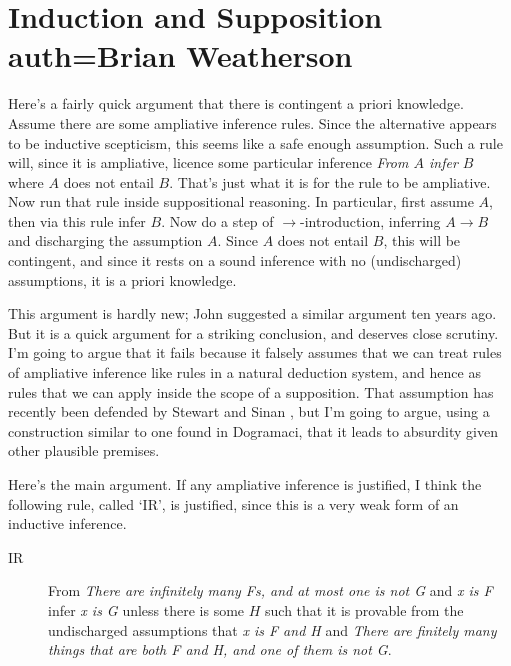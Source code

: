 \providecommand{\ECH}{$E \supset H$}
\providecommand{\mECH}{E \supset H}
\providecommand{\apr}{\textit{a priori}}
\providecommand{\apo}{\textit{a posteriori}}

\chapter[Induction and Supposition]{Induction and Supposition auth=Brian Weatherson}


\noindent Here's a fairly quick argument that there is contingent a priori knowledge. Assume there are some ampliative inference rules. Since the alternative appears to be inductive scepticism, this seems like a safe enough assumption. Such a rule will, since it is ampliative, licence some particular inference \textit{From $A$ infer $B$} where $A$ does not entail $B$. That's just what it is for the rule to be ampliative. Now run that rule inside suppositional reasoning. In particular, first assume $A$, then via this rule infer $B$. Now do a step of $\rightarrow$-introduction, inferring $A \rightarrow B$ and discharging the assumption $A$. Since $A$ does not entail $B$, this will be contingent, and since it rests on a sound inference with no (undischarged) assumptions, it is a priori knowledge. 

This argument is hardly new; John \citet{Hawthorne2002} suggested a similar argument ten years ago. But it is a quick argument for a striking conclusion, and deserves close scrutiny. I'm going to argue that it fails because it falsely assumes that we can treat rules of ampliative inference like rules in a natural deduction system, and hence as rules that we can apply inside the scope of a supposition. That assumption has recently been defended by Stewart \citet{Cohen2010} and Sinan \citet{Dogramaci2010}, but I'm going to argue, using a construction similar to one found in Dogramaci, that it leads to absurdity given other plausible premises.

Here's the main argument. If any ampliative inference is justified, I think the following rule, called `IR', is justified, since this is a very weak form of an inductive inference.

\begin{description}
\item[IR] From \textit{There are infinitely many Fs, and at most one is not G} and \textit{x is F} infer \textit{x is G} unless there is some $H$ such that it is provable from the undischarged assumptions that \textit{x is F and H} and \textit{There are finitely many things that are both F and H, and one of them is not G}.
\end{description}


